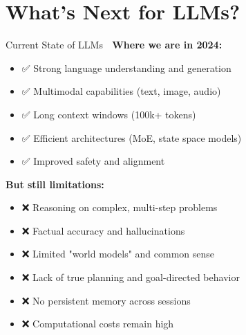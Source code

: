 \documentclass[aspectratio=169]{beamer}
\begin{document}
\section{What's Next for LLMs?}

\begin{frame}[shrink=10]{Current State of LLMs 📍}
\textbf{Where we are in 2024:}
\begin{itemize}\setlength{\itemsep}{0pt}
    \item ✅ Strong language understanding and generation
    \item ✅ Multimodal capabilities (text, image, audio)
    \item ✅ Long context windows (100k+ tokens)
    \item ✅ Efficient architectures (MoE, state space models)
    \item ✅ Improved safety and alignment
\end{itemize}

\vspace{1em}

\textbf{But still limitations:}
\begin{itemize}\setlength{\itemsep}{0pt}
    \item ❌ Reasoning on complex, multi-step problems
    \item ❌ Factual accuracy and hallucinations
    \item ❌ Limited "world models" and common sense
    \item ❌ Lack of true planning and goal-directed behavior
    \item ❌ No persistent memory across sessions
    \item ❌ Computational costs remain high
\end{itemize}
\end{frame}
\end{document}
